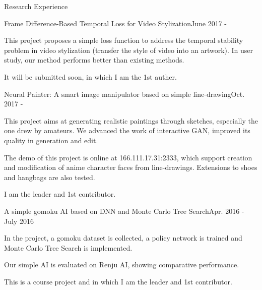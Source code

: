 \documentclass{resume} %
\begin{document}
    \begin{rSection}{Research Experience}
    
    
    \begin{rSubsection}{Frame Difference-Based Temporal Loss for Video Stylization}{June 2017 - }\
        \item This project proposes a simple loss function to address the temporal stability problem in video stylization (transfer the style of video into an artwork). In user study, our method performs better than existing methods. \\
        \item It will be submitted soon, in which I am the 1st auther. \\
    \end{rSubsection}
    
    \begin{rSubsection}{Neural Painter: A smart image manipulator based on simple line-drawing}{Oct. 2017 - } \
        \item This project aims at generating realistic paintings through sketches, especially the one drew by amateurs. We advanced the work of interactive GAN, improved its quality in  generation and edit. \\
        \item The demo of this project is online at 166.111.17.31:2333, which support creation and modification of anime character faces from line-drawings. Extensions to shoes and hangbags are also tested. \\
        \item I am the leader and 1st contributor.
    \end{rSubsection}
    
    \begin{rSubsection}{A simple gomoku AI based on DNN and Monte Carlo Tree Search}{Apr. 2016 - July 2016} \
    \item In the project, a gomoku dataset is collected, a policy network is trained and Monte Carlo Tree Search is implemented. \\
    \item Our simple AI is evaluated on Renju AI, showing comparative performance. \\ 
    \item This is a course project and in which I am the leader and 1st contributor.
    \end{rSubsection}




    
    \end{rSection}
    
\end{document}
